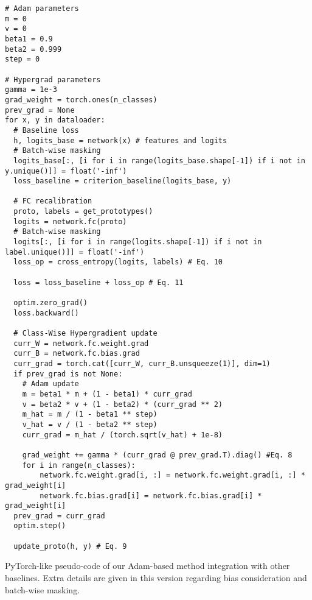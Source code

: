 \begin{algorithm*}[ht]
    \tiny
    \begin{verbatim}
# Adam parameters
m = 0
v = 0
beta1 = 0.9
beta2 = 0.999
step = 0

# Hypergrad parameters
gamma = 1e-3
grad_weight = torch.ones(n_classes)
prev_grad = None
for x, y in dataloader:
  # Baseline loss
  h, logits_base = network(x) # features and logits
  # Batch-wise masking
  logits_base[:, [i for i in range(logits_base.shape[-1]) if i not in y.unique()]] = float('-inf')
  loss_baseline = criterion_baseline(logits_base, y)
  
  # FC recalibration
  proto, labels = get_prototypes()
  logits = network.fc(proto)
  # Batch-wise masking
  logits[:, [i for i in range(logits.shape[-1]) if i not in label.unique()]] = float('-inf')
  loss_op = cross_entropy(logits, labels) # Eq. 10

  loss = loss_baseline + loss_op # Eq. 11
  
  optim.zero_grad()
  loss.backward()

  # Class-Wise Hypergradient update
  curr_W = network.fc.weight.grad
  curr_B = network.fc.bias.grad
  curr_grad = torch.cat([curr_W, curr_B.unsqueeze(1)], dim=1)
  if prev_grad is not None:
    # Adam update
    m = beta1 * m + (1 - beta1) * curr_grad
    v = beta2 * v + (1 - beta2) * (curr_grad ** 2)
    m_hat = m / (1 - beta1 ** step)
    v_hat = v / (1 - beta2 ** step)
    curr_grad = m_hat / (torch.sqrt(v_hat) + 1e-8)
    
    grad_weight += gamma * (curr_grad @ prev_grad.T).diag() #Eq. 8
    for i in range(n_classes):
        network.fc.weight.grad[i, :] = network.fc.weight.grad[i, :] * grad_weight[i]
        network.fc.bias.grad[i] = network.fc.bias.grad[i] * grad_weight[i]
  prev_grad = curr_grad
  optim.step()

  update_proto(h, y) # Eq. 9
    \end{verbatim}
    \caption{PyTorch-like pseudo-code of our Adam-based method integration with other baselines. Extra details are given in this version regarding bias consideration and batch-wise masking.}
    \label{code:pseudo_code_adam}
\end{algorithm*}